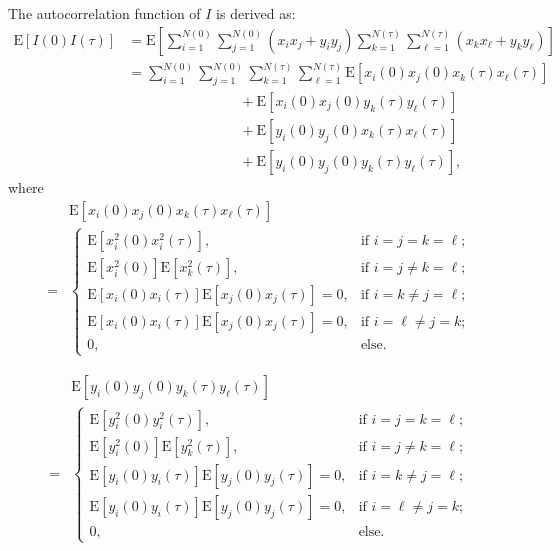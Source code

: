 \documentclass[journal]{IEEEtran}
\begin{document}
The autocorrelation function of $I$ is derived as:
\begin{align}
\mathrm{E}\left[I(0) I(\tau)\right] & = \mathrm{E}\left[\sum_{i=1}^{N(0)} \sum_{j=1}^{N(0)}\left(x_{i} x_{j}+y_{i} y_{j}\right) \sum_{k=1}^{N(\tau) }\sum_{\ell=1}^{N(\tau)}\left(x_{k} x_{\ell} + y_{k} y_{\ell}\right)\right] \nonumber\\
& = \sum_{i=1}^{N(0)} \sum_{j=1}^{N(0)} \sum_{k=1}^{N(\tau)} \sum_{\ell=1}^{N(\tau)}
\mathrm{E}\left[x_{i}(0) x_{j}(0) x_{k}(\tau) x_{\ell}(\tau)\right] \nonumber \\
& \qquad \qquad \qquad \qquad + \mathrm{E}\left[x_{i}(0) x_{j}(0) y_{k}(\tau) y_{\ell}(\tau)\right] \nonumber\\
& \qquad \qquad \qquad \qquad + \mathrm{E}\left[y_{i}(0) y_{j}(0) x_{k}(\tau) x_{\ell}(\tau)\right] \nonumber\\
& \qquad \qquad \qquad \qquad + \mathrm{E}\left[y_{i}(0) y_{j}(0) y_{k}(\tau) y_{\ell}(\tau)\right],
\label{eqA14}
\end{align}
where
\begin{align}
& \mathrm{E}\left[x_{i}(0) x_{j}(0) x_{k}(\tau) x_{\ell}(\tau)\right] \nonumber \\
={} & \begin{cases}
\mathrm{E}\left[x_{i}^{2}(0) x_{i}^{2}(\tau)\right], & \text{if } i=j=k=\ell; \\
\mathrm{E}\left[x_{i}^{2}(0)\right] \mathrm{E}\left[x_{k}^{2}(\tau)\right], & \text{if } i=j \neq k=\ell; \\
\mathrm{E}\left[x_{i}(0) x_{i}(\tau)\right] \mathrm{E}\left[x_{j}(0) x_{j}(\tau)\right] = 0, &  \text{if } i=k \neq j=\ell; \\
\mathrm{E}\left[x_{i}(0) x_{i}(\tau)\right] \mathrm{E}\left[x_{j}(0) x_{j}(\tau)\right] = 0, &  \text{if } i=\ell \neq j=k; \\
0, & \text {else.}
\end{cases}\label{eqA15}
\end{align}

\begin{align}
& \mathrm{E}\left[y_{i}(0) y_{j}(0) y_{k}(\tau) y_{\ell}(\tau)\right] \nonumber \\
={} & \begin{cases}
\mathrm{E}\left[y_{i}^{2}(0) y_{i}^{2}(\tau)\right], & \text{if } i=j=k=\ell; \\
\mathrm{E}\left[y_{i}^{2}(0)\right] \mathrm{E}\left[y_{k}^{2}(\tau)\right], & \text{if } i=j \neq k=\ell; \\
\mathrm{E}\left[y_{i}(0) y_{i}(\tau)\right] \mathrm{E}\left[y_{j}(0) y_{j}(\tau)\right] = 0, &  \text{if } i=k \neq j=\ell; \\
\mathrm{E}\left[y_{i}(0) y_{i}(\tau)\right] \mathrm{E}\left[y_{j}(0) y_{j}(\tau)\right] = 0, &  \text{if } i=\ell \neq j=k; \\
0, & \text {else.}
\end{cases}\label{eqA16}
\end{align}
\end{document}
